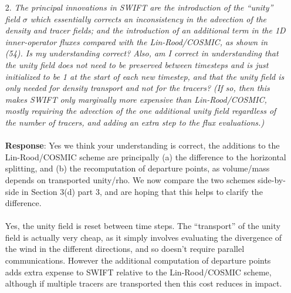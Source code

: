 \documentclass[11pt,a4paper]{article}
\begin{document}
\begin{enumerate}[leftmargin=*]
\item[2.] \textit{The principal innovations in SWIFT are the introduction of the “unity” field $\sigma$ which essentially corrects an inconsistency in the advection of the density and tracer fields; and the introduction of an additional term in the 1D inner-operator fluxes compared with the Lin-Rood/COSMIC, as shown in (54). Is my understanding correct? Also, am I correct in understanding that the unity field does not need to be preserved between timesteps and is just initialized to be 1 at the start of each new timestep, and that the unity field is only needed for density transport and not for the tracers? (If so, then this makes SWIFT only marginally more expensive than Lin-Rood/COSMIC, mostly requiring the advection of the one additional unity field regardless of the number of tracers, and adding an extra step to the flux evaluations.)} \\
\\
\textbf{Response}: Yes we think your understanding is correct, the additions to the Lin-Rood/COSMIC scheme are principally (a) the difference to the horizontal splitting, and (b) the recomputation of departure points, as volume/mass depends on transported unity/rho. We now compare the two schemes side-by-side in Section 3(d) part 3, and are hoping that this helps to clarify the difference. \\
\\
Yes, the unity field is reset between time steps. The ``transport'' of the unity field is actually very cheap, as it simply involves evaluating the divergence of the wind in the different directions, and so doesn't require parallel communications. However the additional computation of departure points adds extra expense to SWIFT relative to the Lin-Rood/COSMIC scheme, although if multiple tracers are transported then this cost reduces in impact.


\end{enumerate}
\end{document}
